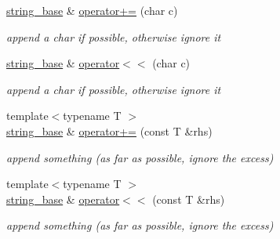 \begin{DoxyCompactItemize}
\mbox{\label{classhwlib_1_1string__base_a24efc5a0bc559310d82d27862b2429a8}} 
\hyperlink{classhwlib_1_1string__base}{string\+\_\+base} \& \hyperlink{classhwlib_1_1string__base_a24efc5a0bc559310d82d27862b2429a8}{operator+=} (char c)
\begin{DoxyCompactList}\small\item\em append a char if possible, otherwise ignore it \end{DoxyCompactList}\item 
\mbox{\label{classhwlib_1_1string__base_a8b04e70fdd82faa9c866f375a075d0a9}} 
\hyperlink{classhwlib_1_1string__base}{string\+\_\+base} \& \hyperlink{classhwlib_1_1string__base_a8b04e70fdd82faa9c866f375a075d0a9}{operator$<$$<$} (char c)
\begin{DoxyCompactList}\small\item\em append a char if possible, otherwise ignore it \end{DoxyCompactList}\item 
\mbox{\label{classhwlib_1_1string__base_a98a64d714ec53831aec7f683c3486d03}} 
{\footnotesize template$<$typename T $>$ }\\\hyperlink{classhwlib_1_1string__base}{string\+\_\+base} \& \hyperlink{classhwlib_1_1string__base_a98a64d714ec53831aec7f683c3486d03}{operator+=} (const T \&rhs)
\begin{DoxyCompactList}\small\item\em append something (as far as possible, ignore the excess) \end{DoxyCompactList}\item 
\mbox{\label{classhwlib_1_1string__base_aa1622b06bdb4b748df1a63b21bcb8ba7}} 
{\footnotesize template$<$typename T $>$ }\\\hyperlink{classhwlib_1_1string__base}{string\+\_\+base} \& \hyperlink{classhwlib_1_1string__base_aa1622b06bdb4b748df1a63b21bcb8ba7}{operator$<$$<$} (const T \&rhs)
\begin{DoxyCompactList}\small\item\em append something (as far as possible, ignore the excess) \end{DoxyCompactList}\item 
\mbox{\label{classhwlib_1_1string__base_aeca01859d90cd3b39d9320d404ad893d}} 

\end{DoxyCompactItemize}
